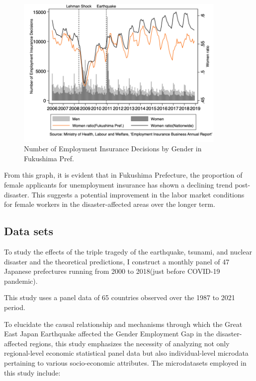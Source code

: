 \documentclass[12pt,halfline,a4paper]{ouparticle}
\begin{document}
\begin{figure}[h!]
    \centering
    \includegraphics[width=0.9\textwidth]{Number of Employment Insurance Decisions_2.png}  %
    \caption{Number of Employment Insurance Decisions by Gender in Fukushima Pref.}
    \label{fig:employment_insurance_decisions}
\end{figure}

From this graph, it is evident that in Fukushima Prefecture, the proportion of female applicants for unemployment insurance has shown a declining trend post-disaster. This suggests a potential improvement in the labor market conditions for female workers in the disaster-affected areas over the longer term.


\subsection{Data sets}
\label{sec5.1}

To study the effects of the triple tragedy of the earthquake, tsunami, and nuclear disaster and the theoretical predictions, I construct a monthly panel of 47 Japanese prefectures running from 2000 to 2018(just before COVID-19 pandemic).


This study uses a panel data of 65 countries observed over the 1987 to 2021 period. 

To elucidate the causal relationship and mechanisms through which the Great East Japan Earthquake affected the Gender Employment Gap in the disaster-affected regions, this study emphasizes the necessity of analyzing not only regional-level economic statistical panel data but also individual-level microdata pertaining to various socio-economic attributes. The microdatasets employed in this study include:
\end{document}
